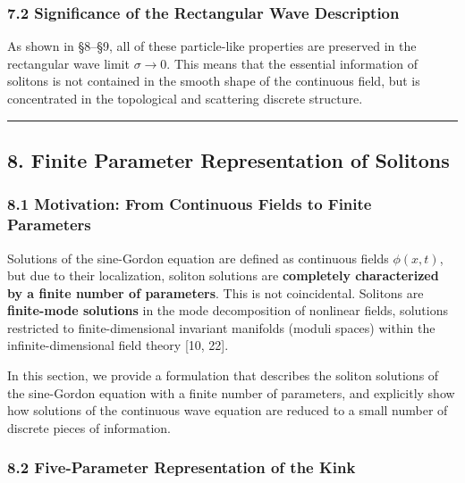\documentclass[a4paper,11pt]{article}
\begin{document}
\subsubsection{7.2 Significance of the Rectangular Wave
Description}\label{significance-of-the-rectangular-wave-description}

As shown in §8--§9, all of these particle-like properties are preserved
in the rectangular wave limit \(\sigma \to 0\). This means that the
essential information of solitons is not contained in the smooth shape
of the continuous field, but is concentrated in the topological and
scattering discrete structure.

\begin{center}\rule{0.5\linewidth}{0.5pt}\end{center}

\subsection{8. Finite Parameter Representation of
Solitons}\label{finite-parameter-representation-of-solitons}

\subsubsection{8.1 Motivation: From Continuous Fields to Finite
Parameters}\label{motivation-from-continuous-fields-to-finite-parameters}

Solutions of the sine-Gordon equation are defined as continuous fields
\(\phi(x, t)\), but due to their localization, soliton solutions are
\textbf{completely characterized by a finite number of parameters}. This
is not coincidental. Solitons are \textbf{finite-mode solutions} in the
mode decomposition of nonlinear fields, solutions restricted to
finite-dimensional invariant manifolds (moduli spaces) within the
infinite-dimensional field theory {[}10, 22{]}.

In this section, we provide a formulation that describes the soliton
solutions of the sine-Gordon equation with a finite number of
parameters, and explicitly show how solutions of the continuous wave
equation are reduced to a small number of discrete pieces of
information.

\subsubsection{8.2 Five-Parameter Representation of the
Kink}\label{five-parameter-representation-of-the-kink}
\end{document}
